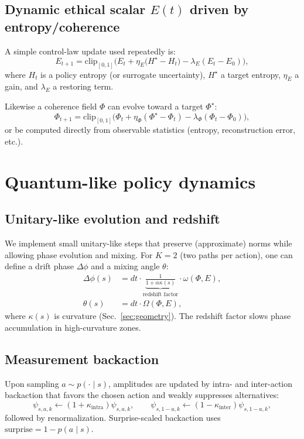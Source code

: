 \documentclass[11pt]{article}
\newcommand{\clip}{\mathrm{clip}}
\begin{document}
\subsection{Dynamic ethical scalar $E(t)$ driven by entropy/coherence}
A simple control-law update used repeatedly is:
\begin{equation}
E_{t+1} = \clip_{[0,1]}\Big(E_t + \eta_E\big(H^\star - H_t\big) - \lambda_E(E_t - E_0)\Big),
\label{eq:E-update}
\end{equation}
where $H_t$ is a policy entropy (or surrogate uncertainty), $H^\star$ a target entropy, $\eta_E$ a gain, and $\lambda_E$ a restoring term.

Likewise a coherence field $\Phi$ can evolve toward a target $\Phi^\star$:
\begin{equation}
\Phi_{t+1} = \clip_{[0,1]}\Big(\Phi_t + \eta_\Phi(\Phi^\star - \Phi_t) - \lambda_\Phi(\Phi_t-\Phi_0)\Big),
\end{equation}
or be computed directly from observable statistics (entropy, reconstruction error, etc.).

\section{Quantum-like policy dynamics}
\subsection{Unitary-like evolution and redshift}
We implement small unitary-like steps that preserve (approximate) norms while allowing phase evolution and mixing. For $K=2$ (two paths per action), one can define a drift phase $\Delta\phi$ and a mixing angle $\theta$:
\begin{align}
\Delta\phi(s) &= dt \cdot \underbrace{\frac{1}{1+\alpha \kappa(s)}}_{\text{redshift factor}} \cdot \omega(\Phi,E),\\
\theta(s) &= dt\cdot \Omega(\Phi,E),
\end{align}
where $\kappa(s)$ is curvature (Sec.~\ref{sec:geometry}). The redshift factor slows phase accumulation in high-curvature zones.

\subsection{Measurement backaction}
Upon sampling $a\sim p(\cdot\mid s)$, amplitudes are updated by intra- and inter-action backaction that favors the chosen action and weakly suppresses alternatives:
\begin{equation}
\psi_{s,a,k} \leftarrow (1+\kappa_{\mathrm{intra}})\psi_{s,a,k},\qquad
\psi_{s,1-a,k} \leftarrow (1-\kappa_{\mathrm{inter}})\psi_{s,1-a,k},
\end{equation}
followed by renormalization. Surprise-scaled backaction uses $\mathrm{surprise}=1-p(a\mid s)$.
\end{document}
